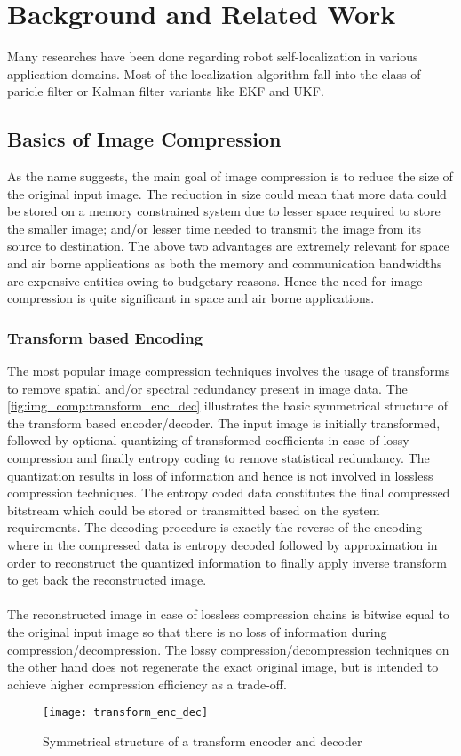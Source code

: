 \chapter{Background and Related Work\label{cha:chapter2}}

Many researches have been done regarding robot self-localization in various application domains. 
Most of the localization algorithm fall into the class of paricle filter or Kalman filter variants like \gls{EKF} and \gls{UKF}.



\section{Basics of Image Compression\label{sec:2.1}}

As the name suggests, the main goal of image compression is to reduce the size of the original input image. The reduction in size could mean that more data could be stored on a memory constrained system due to lesser space required to store the smaller image; and/or lesser time needed to transmit the image from its source to destination. The above two advantages are extremely relevant for space and air borne applications as both the memory and communication bandwidths are expensive entities owing to budgetary reasons. Hence the need for image compression is quite significant in space and air borne applications. 

\subsection{Transform based Encoding}
The most popular image compression techniques involves the usage of transforms to remove spatial and/or spectral redundancy present in image data. The \autoref{fig:img_comp:transform_enc_dec} illustrates the basic symmetrical structure of the transform based encoder/decoder. The input image is initially transformed, followed by optional quantizing of transformed coefficients in case of lossy compression and finally entropy coding to remove statistical redundancy. The quantization results in loss of information and hence is not involved in lossless compression techniques. The entropy coded data constitutes the final compressed bitstream which could be stored or transmitted based on the system requirements. The decoding procedure is exactly the reverse of the encoding where in the compressed data is entropy decoded followed by approximation in order to reconstruct the quantized information to finally apply inverse transform to get back the reconstructed image. \\\\
The reconstructed image in case of lossless compression chains is bitwise equal to the original input image so that there is no loss of information during compression/decompression. The lossy compression/decompression techniques on the other hand does not regenerate the exact original image, but is intended to achieve higher compression efficiency as a trade-off.
\begin{figure}[tb]
  \centering
  \texttt{[image: transform\_enc\_dec]}
  \caption{Symmetrical structure of a transform encoder and decoder}
  \label{fig:img_comp:transform_enc_dec}
\end{figure}
